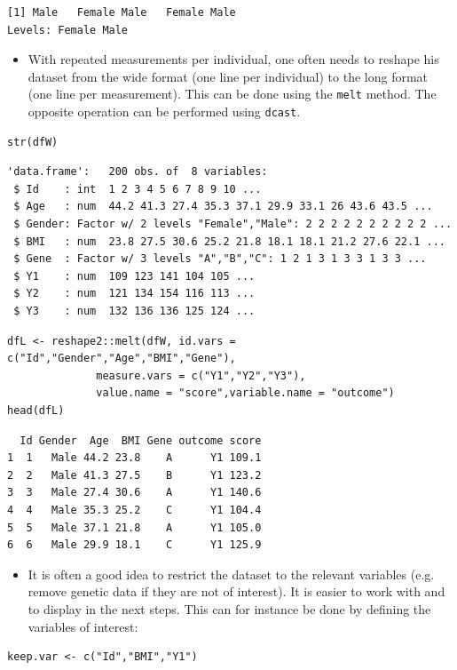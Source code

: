 \documentclass[12pt]{article}
\begin{document}
\begin{verbatim}
[1] Male   Female Male   Female Male  
Levels: Female Male
\end{verbatim}

\begin{itemize}
\item With repeated measurements per individual, one often needs to
reshape his dataset from the wide format (one line per individual)
to the long format (one line per measurement). This can be done
using the \texttt{melt} method. The opposite operation can be performed
using \texttt{dcast}.
\end{itemize}

\lstset{language=r,label= ,caption= ,captionpos=b,numbers=none}
\begin{lstlisting}
str(dfW)
\end{lstlisting}

\begin{verbatim}
'data.frame':	200 obs. of  8 variables:
 $ Id    : int  1 2 3 4 5 6 7 8 9 10 ...
 $ Age   : num  44.2 41.3 27.4 35.3 37.1 29.9 33.1 26 43.6 43.5 ...
 $ Gender: Factor w/ 2 levels "Female","Male": 2 2 2 2 2 2 2 2 2 2 ...
 $ BMI   : num  23.8 27.5 30.6 25.2 21.8 18.1 18.1 21.2 27.6 22.1 ...
 $ Gene  : Factor w/ 3 levels "A","B","C": 1 2 1 3 1 3 3 1 3 3 ...
 $ Y1    : num  109 123 141 104 105 ...
 $ Y2    : num  121 134 154 116 113 ...
 $ Y3    : num  132 136 136 125 124 ...
\end{verbatim}

\lstset{language=r,label= ,caption= ,captionpos=b,numbers=none}
\begin{lstlisting}
dfL <- reshape2::melt(dfW, id.vars = c("Id","Gender","Age","BMI","Gene"),
		      measure.vars = c("Y1","Y2","Y3"),
		      value.name = "score",variable.name = "outcome")
head(dfL)
\end{lstlisting}

\begin{verbatim}
  Id Gender  Age  BMI Gene outcome score
1  1   Male 44.2 23.8    A      Y1 109.1
2  2   Male 41.3 27.5    B      Y1 123.2
3  3   Male 27.4 30.6    A      Y1 140.6
4  4   Male 35.3 25.2    C      Y1 104.4
5  5   Male 37.1 21.8    A      Y1 105.0
6  6   Male 29.9 18.1    C      Y1 125.9
\end{verbatim}


\begin{itemize}
\item It is often a good idea to restrict the dataset to the relevant
variables (e.g. remove genetic data if they are not of interest). It
is easier to work with and to display in the next steps. This can
for instance be done by defining the variables of interest:
\end{itemize}
\lstset{language=r,label= ,caption= ,captionpos=b,numbers=none}
\begin{lstlisting}
keep.var <- c("Id","BMI","Y1")
\end{lstlisting}
\end{document}
